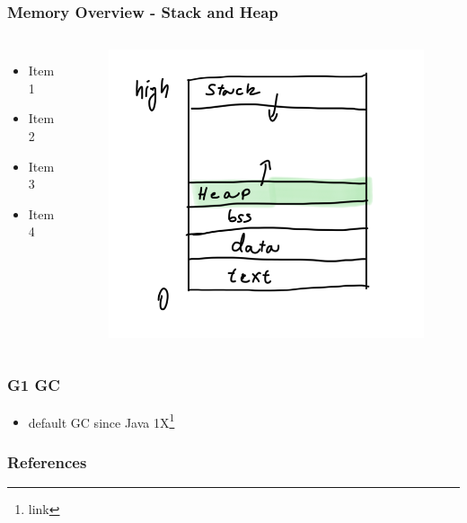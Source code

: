 \documentclass{beamer}
\begin{document}
\begin{frame}
    \frametitle{Memory Overview - Stack and Heap}
    \begin{columns}
        \begin{itemize}
            \item Item 1
            \item Item 2
            \item Item 3
            \item Item 4
          \end{itemize}
        
        
        \begin{figure}
            \centering
            \includegraphics[width=\textwidth]{cmemory.png}
        \end{figure}
        
      \end{columns}
 
\end{frame}



\begin{frame}
    \frametitle{G1 GC}
    \begin{itemize}
        \item default GC since Java 1X\footnote{link}
    \end{itemize}
\end{frame}

\begin{frame}
    \frametitle{References}
    
    
\end{frame}
\end{document}
